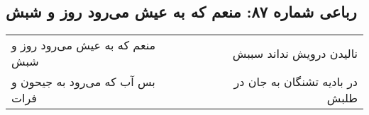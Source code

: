 \begin{center}
\section*{رباعی شماره ۸۷: منعم که به عیش می‌رود روز و شبش}
\label{sec:087}
\begin{longtable}{l p{0.5cm} r}
منعم که به عیش می‌رود روز و شبش
&&
نالیدن درویش نداند سببش
\\
بس آب که می‌رود به جیحون و فرات
&&
در بادیه تشنگان به جان در طلبش
\\
\end{longtable}
\end{center}
